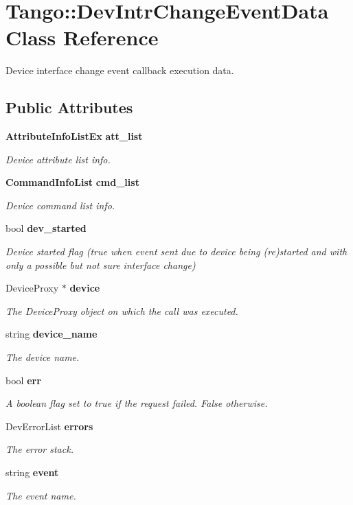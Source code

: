 \section{Tango\-:\-:Dev\-Intr\-Change\-Event\-Data Class Reference}
\label{classTango_1_1DevIntrChangeEventData}


Device interface change event callback execution data.  


\subsection*{Public Attributes}
\begin{DoxyCompactItemize}
\item 
{\bf Attribute\-Info\-List\-Ex} {\bf att\-\_\-list}
\begin{DoxyCompactList}\small\item\em Device attribute list info. \end{DoxyCompactList}\item 
{\bf Command\-Info\-List} {\bf cmd\-\_\-list}
\begin{DoxyCompactList}\small\item\em Device command list info. \end{DoxyCompactList}\item 
bool {\bf dev\-\_\-started}
\begin{DoxyCompactList}\small\item\em Device started flag (true when event sent due to device being (re)started and with only a possible but not sure interface change) \end{DoxyCompactList}\item 
Device\-Proxy $\ast$ {\bf device}
\begin{DoxyCompactList}\small\item\em The Device\-Proxy object on which the call was executed. \end{DoxyCompactList}\item 
string {\bf device\-\_\-name}
\begin{DoxyCompactList}\small\item\em The device name. \end{DoxyCompactList}\item 
bool {\bf err}
\begin{DoxyCompactList}\small\item\em A boolean flag set to true if the request failed. False otherwise. \end{DoxyCompactList}\item 
Dev\-Error\-List {\bf errors}
\begin{DoxyCompactList}\small\item\em The error stack. \end{DoxyCompactList}\item 
string {\bf event}
\begin{DoxyCompactList}\small\item\em The event name. \end{DoxyCompactList}\end{DoxyCompactItemize}



